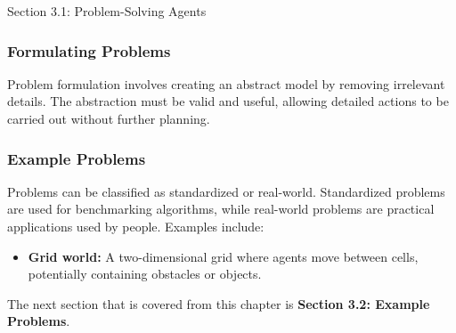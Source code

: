 \begin{notes}{Section 3.1: Problem-Solving Agents}
    \subsubsection*{Formulating Problems}

    Problem formulation involves creating an abstract model by removing irrelevant details. The abstraction must be valid and useful, allowing detailed actions to be carried out without further planning.

    \subsubsection*{Example Problems}

    Problems can be classified as standardized or real-world. Standardized problems are used for benchmarking algorithms, while real-world problems are practical applications used by people. Examples include:
    \begin{itemize}
        \item \textbf{Grid world:} A two-dimensional grid where agents move between cells, potentially containing obstacles or objects.
    \end{itemize}
\end{notes}

The next section that is covered from this chapter is \textbf{Section 3.2: Example Problems}.

